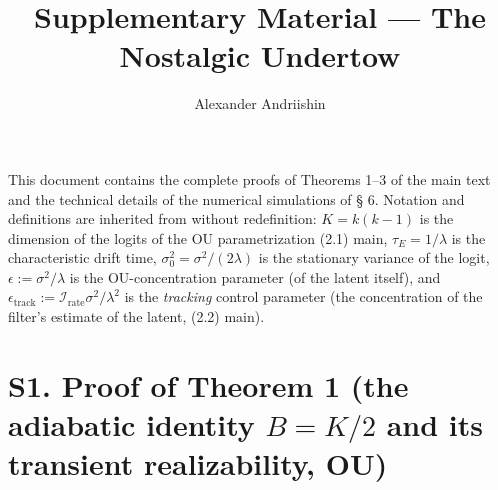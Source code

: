 \documentclass[12pt]{iopart}
\providecommand{\texorpdfstring}[2]{#1}
\begin{document}
\title[Supplementary]{Supplementary Material --- The Nostalgic Undertow}

\author{Alexander Andriishin}

\address{Independent researcher; ORCID 0009-0000-4739-4017; alexander@andriishin.com}

\maketitle

This document contains the complete proofs of Theorems 1--3 of the main text and the technical details of the numerical simulations of § 6. Notation and definitions are inherited from \cite{Andriishin2026b} without redefinition: \(K = k(k-1)\) is the dimension of the logits of the OU parametrization (2.1) main, \(\tau_E = 1/\lambda\) is the characteristic drift time, \(\sigma_0^2 = \sigma^2/(2\lambda)\) is the stationary variance of the logit, \(\epsilon := \sigma^2/\lambda\) is the OU-concentration parameter (of the latent itself), and \(\epsilon_{\text{track}} := \mathcal I_{\text{rate}}\sigma^2/\lambda^2\) is the \emph{tracking} control parameter (the concentration of the filter's estimate of the latent, (2.2) main).



\section{\texorpdfstring{S1. Proof of Theorem 1 (the adiabatic identity \(B=K/2\) and its transient realizability, OU)}{S1. Proof of Theorem 1 (the adiabatic identity B=K/2 and its transient realizability, OU)}}\label{s1.-proof-of-theorem-1-the-adiabatic-identity-bk2-and-its-transient-realizability-ou}
\end{document}
